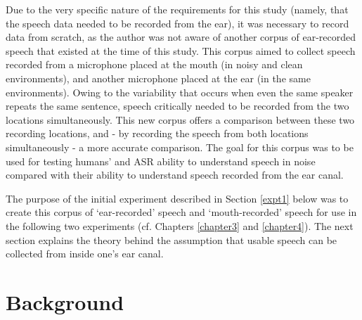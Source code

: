 Due to the very specific nature of the requirements for this study (namely, that the speech data needed to be recorded from the ear), it was necessary to record data from scratch, as the author was not aware of another corpus of ear-recorded speech that existed at the time of this study.  This corpus aimed to collect speech recorded from a microphone placed at the mouth (in noisy and clean environments), and another microphone placed at the ear (in the same environments). Owing to the variability that occurs when even the same speaker repeats the same sentence, speech critically needed to be recorded from the two locations simultaneously.  This new corpus offers a comparison between these two recording locations, and - by recording the speech from both locations simultaneously - a more accurate comparison.  The goal for this corpus was to be used for testing humans' and ASR ability to understand speech in noise compared with their ability to understand speech recorded from the ear canal.


The purpose of the initial experiment described in Section \ref{expt1} below was to create this corpus of `ear-recorded' speech and `mouth-recorded' speech for use in the following two experiments (cf. Chapters \ref{chapter3} and \ref{chapter4}).  The next section explains the theory behind the assumption that usable speech can be collected from inside one's ear canal.

\section{Background}



